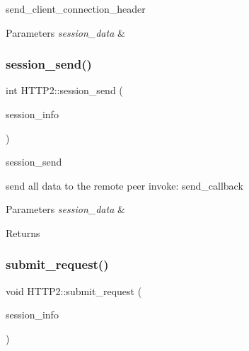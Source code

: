 send\+\_\+client\+\_\+connection\+\_\+header 


\begin{DoxyParams}{Parameters}
{\em session\+\_\+data} & \\
\hline
\end{DoxyParams}
\mbox{\label{classhttp2_1_1HTTP2_a3db7d38c6b0d7c94f2494c9a3050bd78}} 
\subsubsection{\texorpdfstring{session\+\_\+send()}{session\_send()}}
{\footnotesize\ttfamily int H\+T\+T\+P2\+::session\+\_\+send (\begin{DoxyParamCaption}\item[{\hyperlink{classhttp2_1_1HTTP2SessionInfo}{H\+T\+T\+P2\+Session\+Info} $\ast$}]{session\+\_\+info }\end{DoxyParamCaption})\hspace{0.3cm}{\ttfamily [static]}}



session\+\_\+send 

send all data to the remote peer invoke\+: send\+\_\+callback


\begin{DoxyParams}{Parameters}
{\em session\+\_\+data} & \\
\hline
\end{DoxyParams}
\begin{DoxyReturn}{Returns}

\end{DoxyReturn}
\mbox{\label{classhttp2_1_1HTTP2_af26f4183174f132dde6cb4dfd20e5767}} 
\subsubsection{\texorpdfstring{submit\+\_\+request()}{submit\_request()}}
{\footnotesize\ttfamily void H\+T\+T\+P2\+::submit\+\_\+request (\begin{DoxyParamCaption}\item[{\hyperlink{classhttp2_1_1HTTP2SessionInfo}{H\+T\+T\+P2\+Session\+Info} $\ast$}]{session\+\_\+info }\end{DoxyParamCaption})\hspace{0.3cm}{\ttfamily [static]}}


